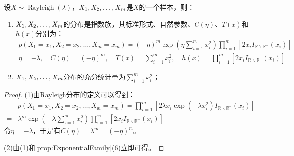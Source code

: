\begin{theorem}
	设$X\sim\operatorname{Rayleigh}(\lambda)$，$X_1, X_2, \dots, X_{m}$是$X$的一个样本，则：
	\begin{enumerate}
		\item $X_1, X_2, \dots, X_{m}$的分布是指数族，其标准形式、自然参数、$C(\eta)$、$T(x)$和$h(x)$分别为：
		\begin{gather*}
			p(X_1=x_1,X_2=x_2,\dots,X_m=x_m) =(-\eta)^m\exp\left(\eta\sum_{i=1}^{m}x_i^2\right)\prod_{i=1}^{m}\left[2x_iI_{\mathbb{R}^{}\backslash\mathbb{R}^{-}}(x_i)\right] \\
			\eta=-\lambda,\quad C(\eta)=(-\eta)^m,\quad
			T(x)=\sum_{i=1}^{m}x_i^2,\quad h(x)=\prod_{i=1}^{m}\left[2x_iI_{\mathbb{R}^{}\backslash\mathbb{R}^{-}}(x_i)\right]
		\end{gather*}
		\item $X_1, X_2, \dots, X_{m}$分布的充分统计量为$\sum\limits_{i=1}^{m}x_i^2$；
	\end{enumerate}
\end{theorem}
\begin{proof}
	(1)由Rayleigh分布的定义可以得到：
	\begin{align*}
		&p(X_1=x_1,X_2=x_2,\dots,X_m=x_m)=\prod_{i=1}^{m}\left[2\lambda x_i\exp(-\lambda x_i^2)I_{\mathbb{R}^{}\backslash\mathbb{R}^{-}}(x_i)\right] \\
		=&\lambda^m\exp\left(-\lambda\sum_{i=1}^{m}x_i^2\right)\prod_{i=1}^{m}\left[2x_iI_{\mathbb{R}^{}\backslash\mathbb{R}^{-}}(x_i)\right]
	\end{align*}
	令$\eta=-\lambda$，于是有$C(\eta)=\lambda^{m}=(-\eta)^m$。\par
	(2)由(1)和\cref{prop:ExponentialFamily}(6)立即可得。
\end{proof}

